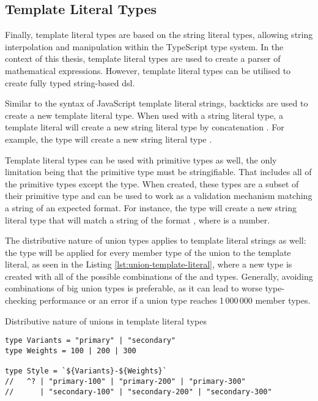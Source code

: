 \subsection{Template Literal Types}

Finally, template literal types are based on the string literal types, allowing string interpolation and manipulation within the TypeScript type system. In the context of this thesis, template literal types are used to create a parser of mathematical expressions. However, template literal types can be utilised to create fully typed string-based \acrfull{dsl}.

Similar to the syntax of JavaScript template literal strings, backticks are used to create a new template literal type. When used with a string literal type, a template literal will create a new string literal type by concatenation \cite{DocumentationTemplateLiteral}. For example, the type  will create a new string literal type .

Template literal types can be used with primitive types as well, the only limitation being that the primitive type must be stringifiable. That includes all of the primitive types except the  type. When created, these types are a subset of their primitive type and can be used to work as a validation mechanism matching a string of an expected format. For instance, the type  will create a new string literal type that will match a string of the format , where  is a number.

The distributive nature of union types applies to template literal strings as well: the type will be applied for every member type of the union to the template literal, as seen in the Listing \ref{lst:union-template-literal}, where a new  type is created with all of the possible combinations of the  and  types. Generally, avoiding combinations of big union types is preferable, as it can lead to worse type-checking performance or an error if a union type reaches 1\,000\,000 member types.

\begin{listing}[ht]
  \caption{Distributive nature of unions in template literal types}\label{lst:union-template-literal}
  \begin{verbatim}
type Variants = "primary" | "secondary"
type Weights = 100 | 200 | 300

type Style = `${Variants}-${Weights}`
//   ^? | "primary-100" | "primary-200" | "primary-300" 
//      | "secondary-100" | "secondary-200" | "secondary-300"
\end{verbatim}
\end{listing}

